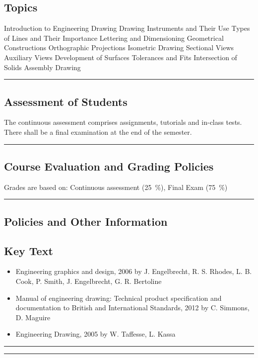 \subsection*{Topics}
\begin{outline}
    \1 Introduction to Engineering Drawing
    \1 Drawing Instruments and Their Use
    \1 Types of Lines and Their Importance
    \1 Lettering and Dimensioning
    \1 Geometrical Constructions
    \1 Orthographic Projections
    \1 Isometric Drawing
    \1 Sectional Views
    \1 Auxiliary Views
    \1 Development of Surfaces
    \1 Tolerances and Fits
    \1 Intersection of Solids
    \1 Assembly Drawing
\end{outline}
\vspace{2ex} \hrule\vspace{2ex}

\subsection*{Assessment of Students}
\begin{outline}
    \1 The continuous assessment comprises assignments, tutorials and in-class tests.
    \1 There shall be a final examination at the end of the semester.
\end{outline}
\vspace{2ex}\hrule\vspace{2ex}

\subsection*{Course Evaluation and Grading Policies}
Grades are based on:
Continuous assessment (\qty{25}{\percent}),
Final Exam (\qty{75}{\percent})
\vspace{2ex}\hrule\vspace{2ex}

\subsection*{Policies and Other Information}
\subsection*{Key Text}
\begin{itemize}
    \item Engineering graphics and design, 2006 by J. Engelbrecht, R. S. Rhodes, L. B. Cook, P. Smith, J. Engelbrecht, G. R. Bertoline
    \item  Manual of engineering drawing: Technical product specification and documentation to British and International Standards, 2012 by C. Simmons, D. Maguire
    \item Engineering Drawing, 2005 by W. Taffesse, L. Kassa
\end{itemize}
\vspace{2ex}\hrule
\vspace{2ex}\hrule\vspace{2ex}